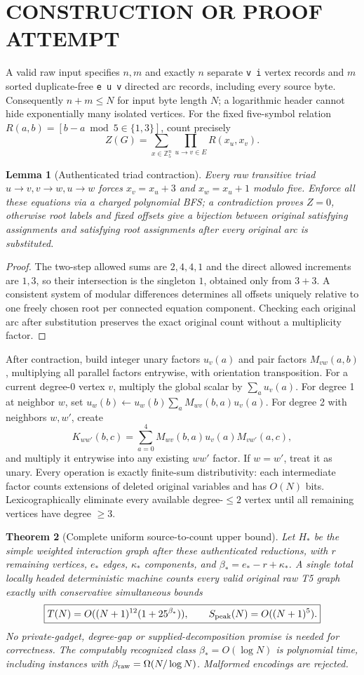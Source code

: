 \documentclass[11pt]{article}
\newtheorem{theorem}{Theorem}
\newtheorem{lemma}[theorem]{Lemma}
\begin{document}
\section{CONSTRUCTION OR PROOF ATTEMPT}
A valid raw input specifies $n,m$ and exactly $n$ separate \texttt{v i} vertex records and $m$ sorted duplicate-free \texttt{e u v} directed arc records, including every source byte. Consequently $n+m\le N$ for input byte length $N$; a logarithmic header cannot hide exponentially many isolated vertices. For the fixed five-symbol relation $R(a,b)=[b-a\bmod5\in\{1,3\}]$, count precisely
\[Z(G)=\sum_{x\in\mathbb Z_5^n}\prod_{u\to v\in E} R(x_u,x_v).\]
\begin{lemma}[Authenticated triad contraction]
Every raw transitive triad $u\to v,v\to w,u\to w$ forces $x_v=x_u+3$ and $x_w=x_u+1$ modulo five. Enforce all these equations via a charged polynomial BFS; a contradiction proves $Z=0$, otherwise root labels and fixed offsets give a bijection between original satisfying assignments and satisfying root assignments after \emph{every original arc} is substituted.
\end{lemma}
\begin{proof}
The two-step allowed sums are $2,4,4,1$ and the direct allowed increments are $1,3$, so their intersection is the singleton $1$, obtained only from $3+3$. A consistent system of modular differences determines all offsets uniquely relative to one freely chosen root per connected equation component. Checking each original arc after substitution preserves the exact original count without a multiplicity factor.
\end{proof}
After contraction, build integer unary factors $u_v(a)$ and pair factors $M_{vw}(a,b)$, multiplying all parallel factors entrywise, with orientation transposition. For a current degree-0 vertex $v$, multiply the global scalar by $\sum_a u_v(a)$. For degree 1 at neighbor $w$, set $u_w(b)\gets u_w(b)\sum_aM_{wv}(b,a)u_v(a)$. For degree 2 with neighbors $w,w'$, create
\[K_{ww'}(b,c)=\sum_{a=0}^4 M_{wv}(b,a)u_v(a)M_{vw'}(a,c),\]
and multiply it entrywise into any existing $ww'$ factor. If $w=w'$, treat it as unary. Every operation is exactly finite-sum distributivity: each intermediate factor counts extensions of deleted original variables and has $O(N)$ bits. Lexicographically eliminate every available degree-$\le2$ vertex until all remaining vertices have degree $\ge3$.
\begin{theorem}[Complete uniform source-to-count upper bound]
Let $H_*$ be the simple weighted interaction graph after these authenticated reductions, with $r$ remaining vertices, $e_*$ edges, $\kappa_*$ components, and $\beta_*=e_*-r+\kappa_*$. A single total locally headed deterministic machine counts every valid original raw T5 graph exactly with conservative simultaneous bounds
\[\boxed{T(N)=O((N+1)^{12}(1+25^{\beta_*})),\qquad S_{\rm peak}(N)=O((N+1)^5).}\]
No private-gadget, degree-gap or supplied-decomposition promise is needed for correctness. The computably recognized class $\beta_*=O(\log N)$ is polynomial time, including instances with $\beta_{\rm raw}=\Omega(N/\log N)$. Malformed encodings are rejected.
\end{theorem}
\end{document}
